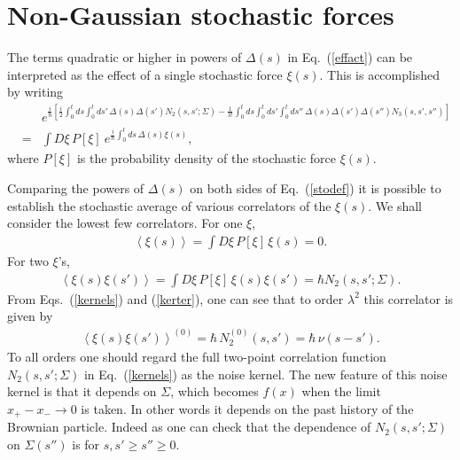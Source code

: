 \documentclass[%
amssymb,preprint,preprintnumbers,nofootinbib,superscriptaddress]{revtex4}
\begin{document}
%
%
%

\section{Non-Gaussian stochastic forces}\label{sec:stochastic}

The terms quadratic or higher in powers of $\Delta(s)$ in Eq.~(\ref{effact}) can be interpreted as the effect of a single stochastic force $\xi(s)$. This is accomplished by writing
\begin{eqnarray}
&&e^{\frac{i}{\hbar}\left[\frac{i}{2}\int_{0}^{t}ds\int_{0}^{t}ds'\,\Delta(s)\Delta(s')N_{2}(s,s';\Sigma)
-\frac{1}{3!}\int_{0}^{t}ds\int_{0}^{t}ds'\int_{0}^{t}ds''\,\Delta(s)\Delta(s')\Delta(s'')N_{3}(s,s',s'')\right]}\nonumber\\
&=&\int D\xi\, P[\xi]\ e^{\frac{i}{\hbar}\int_{0}^{t}ds\,\Delta(s)\xi(s)},\label{stodef}
\end{eqnarray}
where $P[\xi]$ is the probability density of the stochastic force $\xi(s)$. 

Comparing the powers of $\Delta(s)$ on both sides of Eq.~(\ref{stodef}) it is possible to establish the stochastic average of various correlators of the $\xi(s)$. We shall consider the lowest few correlators. For one $\xi$,
\begin{eqnarray}
\left\langle\xi(s)\right\rangle=\int D\xi\, P[\xi]\,\xi(s)=0.
\end{eqnarray}
For two $\xi$'s,
\begin{eqnarray}
\left\langle\xi(s)\xi(s')\right\rangle=\int D\xi\, P[\xi]\,\xi(s)\xi(s')
=\hbar N_{2}(s,s';\Sigma).
\end{eqnarray}
From Eqs.~(\ref{kernels}) and (\ref{kerter}), one can see that to order $\lambda^{2}$ this correlator is given by
\begin{eqnarray}\label{n20}
\left\langle\xi(s)\xi(s')\right\rangle^{(0)}=\hbar\,N_{2}^{(0)}(s,s')
=\hbar\,\nu(s-s').
\end{eqnarray}
To all orders one should regard the full two-point correlation function $N_{2}(s,s';\Sigma)$ in Eq.~(\ref{kernels}) as the noise kernel. The new feature of this noise kernel is that it depends on $\Sigma$, which becomes $f(x)$ when the limit $x_{+}-x_{-}\rightarrow 0$ is taken. In other words it depends on the past history of the Brownian particle. Indeed as one can check that the dependence of $N_{2}(s,s';\Sigma)$ on $\Sigma(s'')$ is for $s,s'\geq s''\geq 0$.
\end{document}
